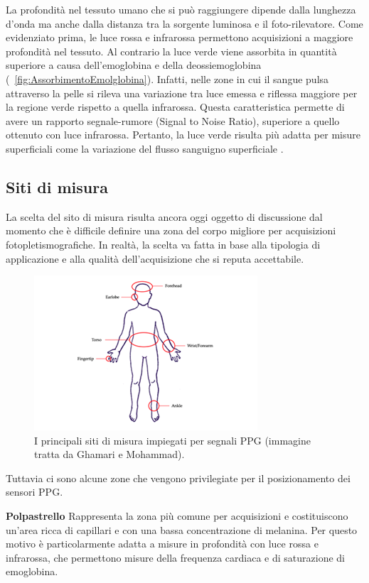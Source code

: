 La profondità nel tessuto umano che si può raggiungere dipende dalla lunghezza d'onda ma anche dalla distanza tra la sorgente luminosa e il foto-rilevatore. Come evidenziato prima, le luce rossa e infrarossa permettono acquisizioni a maggiore profondità nel tessuto. Al contrario la luce verde viene assorbita in quantità superiore\cite{Lee2021} a causa dell'emoglobina e della deossiemoglobina (\Fig~\ref{fig:AssorbimentoEmolglobina}). Infatti, nelle zone in cui il sangue pulsa attraverso la pelle si rileva una variazione tra luce emessa e riflessa maggiore per la regione verde rispetto a quella infrarossa. Questa caratteristica permette di avere un rapporto segnale-rumore (Signal to Noise Ratio), superiore a quello ottenuto con luce infrarossa. Pertanto, la luce verde risulta più adatta per misure superficiali come la variazione del flusso sanguigno superficiale \cite{Youssef2020}.

\clearpage

\subsection{Siti di misura}
La scelta del sito di misura risulta ancora oggi oggetto di discussione dal momento che è difficile definire una zona del corpo migliore per acquisizioni fotopletismografiche. In realtà, la scelta va fatta in base alla tipologia di applicazione e alla qualità dell'acquisizione che si reputa accettabile.
\begin{figure}[b]
	\centering
	\includegraphics[width=0.6\linewidth]{ImageFiles/Fotopletismografia/ZoneAcquisizione}
	\caption{I principali siti di misura impiegati per segnali PPG (immagine tratta da Ghamari e Mohammad\cite{Ghamari2018}).}
	\label{fig:ZoneAcquisizione}
\end{figure}
Tuttavia ci sono alcune zone che vengono privilegiate per il posizionamento dei sensori PPG.

\textbf{Polpastrello} Rappresenta la zona più comune per acquisizioni e costituiscono un'area ricca di capillari e con una bassa concentrazione di melanina. Per questo motivo è particolarmente adatta a misure in profondità con luce rossa e infrarossa, che permettono misure della frequenza cardiaca e di saturazione di emoglobina.

